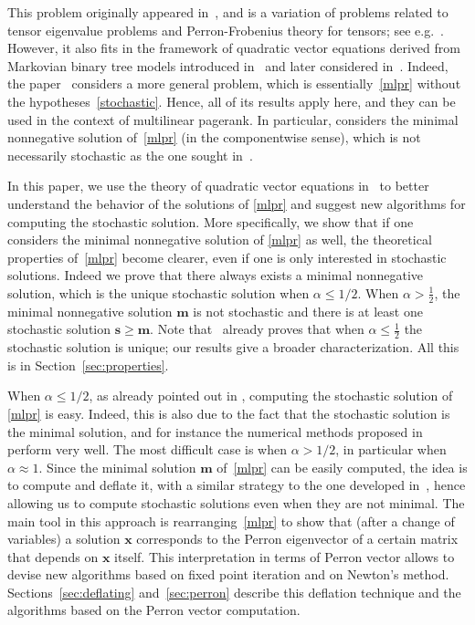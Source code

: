 \documentclass[10pt]{paper}
\begin{document}
This problem originally appeared in~\cite{LiN14}, and is a variation of problems related to tensor eigenvalue problems and Perron-Frobenius theory for tensors; see e.g.~\cite{Lim05,Cha08,Fri13}. However, it also fits in the framework of quadratic vector equations derived from Markovian binary tree models introduced in~\cite{HauLR08} and later considered in~\cite{BinMP11,MeiP11,Pol13}.
Indeed, the paper~\cite{Pol13} considers a more general problem, which is essentially~\eqref{mlpr} without the hypotheses~\eqref{stochastic}. Hence, all of its results apply here, and they can be used in the context of multilinear pagerank. In particular, \cite{Pol13} considers the minimal nonnegative solution of~\eqref{mlpr} (in the componentwise sense), which is not necessarily stochastic as the one sought in~\cite{GleLY15}. 

In this paper, we use the theory of quadratic vector equations in~\cite{BinMP11,MeiP11,Pol13} to better understand the behavior of the solutions of \eqref{mlpr}
and suggest new algorithms for computing the stochastic solution.
More specifically, we show that if one considers the minimal nonnegative solution of \eqref{mlpr} as well, the theoretical properties of~\eqref{mlpr} become clearer, even if one is only interested in stochastic solutions.
Indeed we prove that there always exists a minimal nonnegative solution, which is the unique stochastic solution  when $\alpha\le 1/2$. 	When $\alpha > \frac12$,  the minimal nonnegative solution ${\mathbf{m}}$ is not stochastic  and there is at least one stochastic solution ${\mathbf{s}} \geq {\mathbf{m}}$. 
Note that~\cite[Theorem~4.3]{GleLY15} already proves that when $\alpha \leq \frac12$ the  stochastic solution is unique; our results give a broader characterization.
All this is in Section~\ref{sec:properties}.

When $\alpha\le 1/2$, as already pointed out in \cite{GleLY15}, computing the stochastic solution of \eqref{mlpr} is easy. Indeed, this is also due to the fact that the stochastic solution is the minimal solution, and for instance the numerical methods proposed in \cite{HauLR08,BinMP11,MeiP11} perform very well.
The most difficult case is when $\alpha>1/2$, in particular when $\alpha\approx 1$. Since the minimal solution ${\mathbf{m}}$ of~\eqref{mlpr}  can be easily computed, the idea is to compute and deflate it, with a similar strategy to the one developed in~\cite{BinMP11,MeiP11},   hence allowing us to compute stochastic solutions even when they are not minimal. 
The main tool in this approach is rearranging~\eqref{mlpr} to show that (after a change of variables) a solution ${\mathbf{x}}$ corresponds to the Perron eigenvector of a certain matrix that depends on ${\mathbf{x}}$ itself. This interpretation in terms of Perron vector allows to devise new algorithms based on fixed point iteration and on Newton's method.
Sections~\ref{sec:deflating} and~\ref{sec:perron} describe this deflation technique and the algorithms based on the Perron vector computation.
\end{document}
